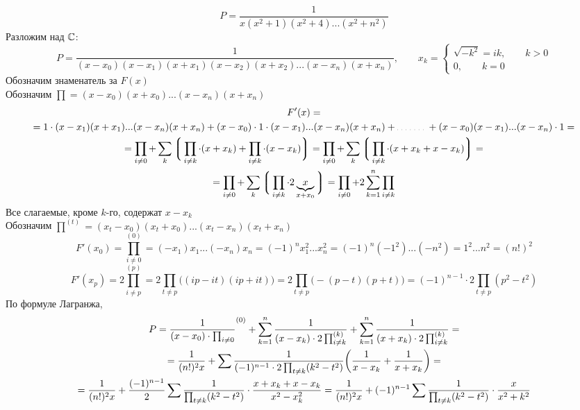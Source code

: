 $$ P = \frac1{x(x^2 + 1)(x^2 + 4)...(x^2 + n^2)} $$
Разложим над $ \Co $:
$$ P = \frac1{(x - x_0)(x - x_1)(x + x_1)(x - x_2)(x + x_2)...(x - x_n)(x + x_n)}, \qquad x_k =
\begin{cases}
	\sqrt{-k^2} = ik, \qquad k > 0 \\
    0, \qquad k = 0
\end{cases} $$
Обозначим знаменатель за $ F(x) $ \\
Обозначим $ \prod = (x - x_0)(x + x_0)...(x - x_n)(x + x_n) $
\begin{multline*}
    F'(x) =  \\
    = 1 \cdot (x - x_1)(x + x_1)...(x - x_n)(x + x_n) + (x - x_0) \cdot 1 \cdot (x - x_1)...(x - x_n)(x + x_n) + \widedots[3em] + (x - x_0)(x - x_1)...(x - x_n) \cdot 1 = \\
    = \prod_{i \ne 0} + \sum_k \bigg\lgroup \prod_{i \ne k} \cdot (x + x_k) + \prod_{i \ne k} \cdot (x - x_k) \bigg\rgroup = \prod_{i \ne 0} + \sum_k \bigg\lgroup \prod_{i \ne k} \cdot (x + x_k + x - x_k) \bigg\rgroup = \\
    = \prod_{i \ne 0} + \sum_k \bigg\lgroup \prod_{i \ne k} \cdot 2\underbrace{x}_{x + x_0} \bigg\rgroup = \prod_{i \ne 0} + 2\sum_{k = 1}^n \prod_{i \ne k}
\end{multline*}
Все слагаемые, кроме $ k $-го, содержат $ x - x_k $ \\
Обозначим $ \prod^{(t)} = (x_t - x_0)(x_t + x_0)...(x_t - x_n)(x_t + x_n) $
$$ F'(x_0) = \prod_{i \ne 0}^{(0)} = (-x_1)x_1...(-x_n)x_n = (-1)^nx_1^2...x_n^2 = (-1)^n(-1^2)...(-n^2) = 1^2...n^2 = (n!)^2 $$
$$ F'(x_p) = 2 \prod_{i \ne p}^{(p)} = 2\prod_{t \ne p} \bigg( (ip - it)(ip + it) \bigg) = 2\prod_{t \ne p} \bigg( -(p - t)(p + t) \bigg) = (-1)^{n - 1} \cdot 2 \prod_{t \ne p} (p^2 - t^2) $$
По формуле Лагранжа,
\begin{multline*}
    P = \frac1{(x - x_0) \cdot \prod_{i \ne 0}}^{(0)} + \sum_{k = 1}^n \frac1{(x - x_k) \cdot 2\prod_{i \ne k}^{(k)}} + \sum_{k = 1}^n \frac1{(x + x_k) \cdot 2\prod_{i \ne k}^{(k)}} = \\
    = \frac1{(n!)^2x} + \sum \frac1{(-1)^{n - 1} \cdot 2\prod_{t \ne k} (k^2 - t^2)} \bigg( \frac1{x - x_k} + \frac1{x + x_k} \bigg) = \\
    = \frac1{(n!)^2x} + \half[(-1)^{n - 1}] \sum \frac1{\prod_{t \ne k}(k^2 - t^2)} \cdot \frac{x + x_k + x - x_k}{x^2 - x_k^2} = \frac1{(n!)^2x} + (-1)^{n - 1} \sum \frac1{\prod_{t \ne k}(k^2 - t^2)} \cdot \frac{x}{x^2 + k^2}
\end{multline*}

